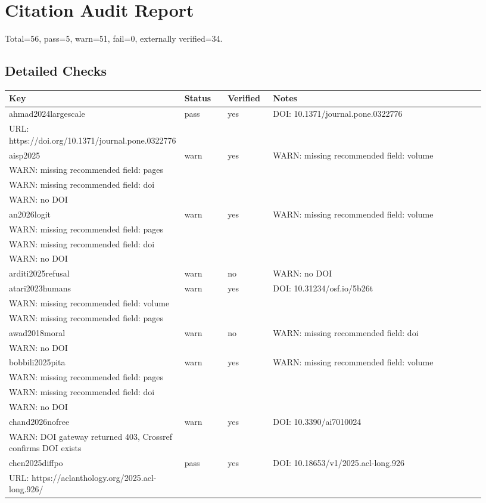 \documentclass[11pt]{article}
\begin{document}
\section*{Citation Audit Report}
Total=56, pass=5, warn=51, fail=0, externally verified=34.
\subsection*{Detailed Checks}
\begin{longtable}{p{0.18\linewidth}p{0.1\linewidth}p{0.1\linewidth}p{0.55\linewidth}}
\toprule Key & Status & Verified & Notes \\ \midrule
\endhead
ahmad2024largescale & pass & yes & DOI: 10.1371/journal.pone.0322776 \\ URL: https://doi.org/10.1371/journal.pone.0322776 \\
aisp2025 & warn & yes & WARN: missing recommended field: volume \\ WARN: missing recommended field: pages \\ WARN: missing recommended field: doi \\ WARN: no DOI \\
an2026logit & warn & yes & WARN: missing recommended field: volume \\ WARN: missing recommended field: pages \\ WARN: missing recommended field: doi \\ WARN: no DOI \\
arditi2025refusal & warn & no & WARN: no DOI \\
atari2023humans & warn & yes & DOI: 10.31234/osf.io/5b26t \\ WARN: missing recommended field: volume \\ WARN: missing recommended field: pages \\
awad2018moral & warn & no & WARN: missing recommended field: doi \\ WARN: no DOI \\
bobbili2025pita & warn & yes & WARN: missing recommended field: volume \\ WARN: missing recommended field: pages \\ WARN: missing recommended field: doi \\ WARN: no DOI \\
chand2026nofree & warn & yes & DOI: 10.3390/ai7010024 \\ WARN: DOI gateway returned 403, Crossref confirms DOI exists \\
chen2025diffpo & pass & yes & DOI: 10.18653/v1/2025.acl-long.926 \\ URL: https://aclanthology.org/2025.acl-long.926/ \\

\end{longtable}
\end{document}
